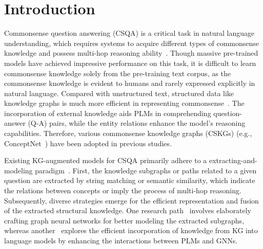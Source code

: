 \documentclass[runningheads]{llncs}
\begin{document}
\section{Introduction}

Commonsense question answering (CSQA) is a critical task in natural language understanding, which requires systems to acquire different types of commonsense knowledge and possess multi-hop reasoning ability~\cite{ref:csqa,ref:obqa,ref:socialiqa}. Though massive pre-trained models have achieved impressive performance on this task, it is difficult to learn commonsense knowledge solely from the pre-training text corpus, as the commonsense knowledge is evident to humans and rarely expressed explicitly in natural language. Compared with unstructured text, structured data like knowledge graphs is much more efficient in representing commonsense~\cite{ref:jointlk}. The incorporation of external knowledge aids PLMs in comprehending question-answer (Q-A) pairs, while the entity relations enhance the model’s reasoning capabilities. Therefore, various commonsense knowledge graphs (CSKGs) (e.g., ConceptNet~\cite{ref:cpnet}) have been adopted in previous studies.

Existing KG-augmented models for CSQA primarily adhere to a extracting-and-modeling paradigm~\cite{ref:greaselm,ref:jointlk,ref:gsc,ref:dhlk,ref:grape,ref:fits}. First, the knowledge subgraphs or paths related to a given question are extracted by string matching or semantic similarity, which indicate the relations between concepts or imply the process of multi-hop reasoning. Subsequently, diverse strategies emerge for the efficient representation and fusion of the extracted structural knowledge. One research path~\cite{ref:safe,ref:hamqa} involves elaborately crafting graph neural networks for better modeling the extracted subgraphs, whereas another~\cite{ref:qagnn,ref:jointlk} explores the efficient incorporation of knowledge from KG into language models by enhancing the interactions between PLMs and GNNs.
\end{document}
